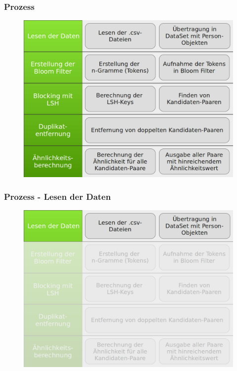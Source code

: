 \documentclass{beamer}
\begin{document}
    \begin{frame}
    		\frametitle{Prozess}
    		\begin{figure}[H]
    			\includegraphics[width=\textwidth]{graphics/process.png}
    		\end{figure}
    \end{frame}
    
    \begin{frame}
    		\frametitle{Prozess - Lesen der Daten}
    		\begin{figure}[H]
    			\includegraphics[width=\textwidth]{graphics/process_1.png}
    		\end{figure}
    \end{frame}
    
\end{document}
